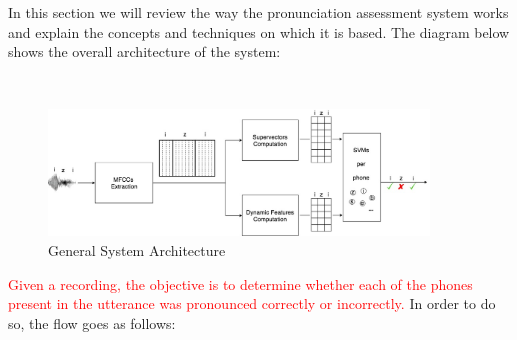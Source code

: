 In this section we will review the way the pronunciation assessment system works
and explain the concepts and techniques on which it is based. The diagram below
shows the overall architecture of the system:

~

\begin{figure}[H]
	\centering
	\includegraphics[width=0.9\textwidth]{files/figures/method/arquitectura_sistema_compuesto_v4.jpg}
	\caption{General System Architecture}
	\label{fig:methodGeneralArchitecture}
\end{figure}

\textcolor{red}{Given a recording, the objective is to determine whether each of the phones
present in the utterance was pronounced correctly or incorrectly.}
In order to do so, the flow goes as follows:

